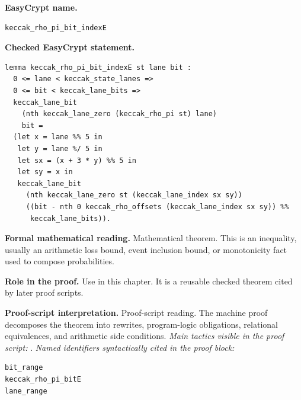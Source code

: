 \begin{formaltheorem}
\noindent\textbf{EasyCrypt name.}
\begin{lstlisting}[language=EasyCrypt,basicstyle=\ttfamily\scriptsize]
keccak_rho_pi_bit_indexE
\end{lstlisting}
\noindent\textbf{Checked EasyCrypt statement.}
\begin{lstlisting}[language=EasyCrypt,basicstyle=\ttfamily\scriptsize]
lemma keccak_rho_pi_bit_indexE st lane bit :
  0 <= lane < keccak_state_lanes =>
  0 <= bit < keccak_lane_bits =>
  keccak_lane_bit
    (nth keccak_lane_zero (keccak_rho_pi st) lane)
    bit =
  (let x = lane %% 5 in
   let y = lane %/ 5 in
   let sx = (x + 3 * y) %% 5 in
   let sy = x in
   keccak_lane_bit
     (nth keccak_lane_zero st (keccak_lane_index sx sy))
     ((bit - nth 0 keccak_rho_offsets (keccak_lane_index sx sy)) %%
      keccak_lane_bits)).
\end{lstlisting}
\noindent\textbf{Formal mathematical reading.}
Mathematical theorem. This is an inequality, usually an arithmetic loss bound, event inclusion bound, or monotonicity fact used to compose probabilities.

\noindent\textbf{Role in the proof.}
Use in this chapter. It is a reusable checked theorem cited by later proof scripts.

\noindent\textbf{Proof-script interpretation.}
Proof-script reading. The machine proof decomposes the theorem into rewrites, program-logic obligations, relational equivalences, and arithmetic side conditions.
\emph{Main tactics visible in the proof script:} .
\emph{Named identifiers syntactically cited in the proof block:}
\begin{lstlisting}[language=EasyCrypt,basicstyle=\ttfamily\scriptsize]
bit_range
keccak_rho_pi_bitE
lane_range
\end{lstlisting}

\end{formaltheorem}

